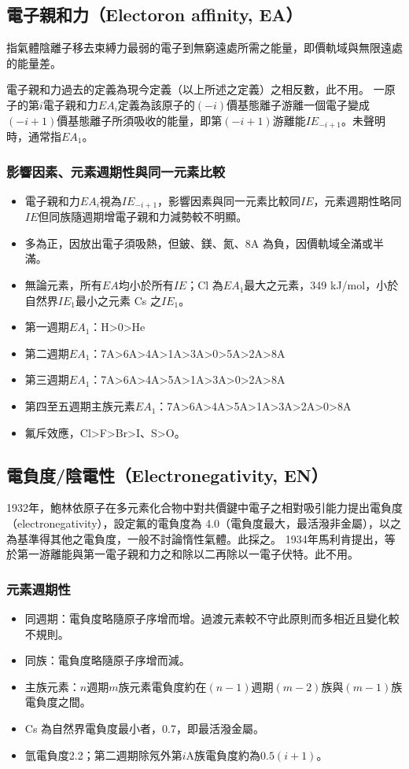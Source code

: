 \documentclass[a4paper,12pt]{article}
\begin{document}
\subsection{電子親和力（Electoron affinity, EA）}
\bctf{}\efct
{}
指氣體陰離子移去束縛力最弱的電子到無窮遠處所需之能量，即價軌域與無限遠處的能量差。

電子親和力過去的定義為現今定義（以上所述之定義）之相反數，此不用。
一原子的第$i$電子親和力$EA_i$定義為該原子的$(-i)$價基態離子游離一個電子變成$(-i+1)$價基態離子所須吸收的能量，即第$(-i+1)$游離能$IE_{-i+1}$。未聲明時，通常指$EA_1$。
\subsubsection{影響因素、元素週期性與同一元素比較}
\begin{itemize}
\item 電子親和力$EA_i$視為$IE_{-i+1}$，影響因素與同一元素比較同$IE$，元素週期性略同$IE$但同族隨週期增電子親和力減勢較不明顯。
\item 多為正，因放出電子須吸熱，但鈹、鎂、氮、8A 為負，因價軌域全滿或半滿。
\item 無論元素，所有$EA$均小於所有$IE$；Cl 為$EA_1$最大之元素，349 kJ/mol，小於自然界$IE_1$最小之元素 Cs 之$IE_1$。
\item 第一週期$EA_1$：H>0>He
\item 第二週期$EA_1$：7A>6A>4A>1A>3A>0>5A>2A>8A
\item 第三週期$EA_1$：7A>6A>4A>5A>1A>3A>0>2A>8A
\item 第四至五週期主族元素$EA_1$：7A>6A>4A>5A>1A>3A>2A>0>8A
\item 氟斥效應，Cl>F>Br>I、S>O。
\end{itemize}
\subsection{電負度/陰電性（Electronegativity, EN）}
\bctf{}\efct
{}
1932年，鮑林依原子在多元素化合物中對共價鍵中電子之相對吸引能力提出電負度（electronegativity），設定氟的電負度為 4.0（電負度最大，最活潑非金屬），以之為基準得其他之電負度，一般不討論惰性氣體。此採之。
1934年馬利肯提出，等於第一游離能與第一電子親和力之和除以二再除以一電子伏特。此不用。
\subsubsection{元素週期性}
\begin{itemize}
\item 同週期：電負度略隨原子序增而增。過渡元素較不守此原則而多相近且變化較不規則。
\item 同族：電負度略隨原子序增而減。
\item 主族元素：$n$週期$m$族元素電負度約在$(n-1)$週期$(m-2)$族與$(m-1)$族電負度之間。
\item Cs 為自然界電負度最小者，0.7，即最活潑金屬。
\item 氫電負度2.2；第二週期除氖外第$i$A族電負度約為$0.5(i+1)$。
\end{itemize}
\end{document}

